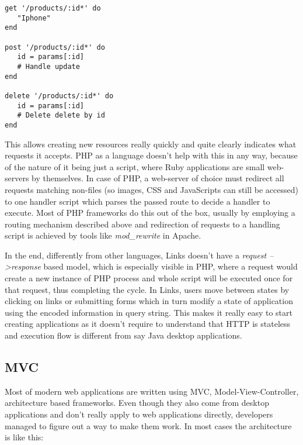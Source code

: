 \begin{codelisting}
\begin{verbatim}
get '/products/:id*' do
   "Iphone"
end

post '/products/:id*' do
   id = params[:id]
   # Handle update
end

delete '/products/:id*' do
   id = params[:id]
   # Delete delete by id
end
\end{verbatim}
\end{codelisting}

This allows creating new resources really quickly and quite clearly indicates what requests it accepts. PHP as a language doesn't help with this in any way, because of the nature of it being just a script, where Ruby applications are small web-servers by themselves. In case of PHP, a web-server of choice must redirect all requests matching non-files (so images, CSS and JavaScripts can still be accessed) to one handler script which parses the passed route to decide a handler to execute. Most of PHP frameworks do this out of the box, usually by employing a routing mechanism described above and redirection of requests to a handling script is achieved by tools like \textit{mod\_rewrite} in Apache.

In the end, differently from other languages, Links doesn't have a \textit{request --\textgreater  response} based model, which is especially visible in PHP, where a request would create a new instance of PHP process and whole script will be executed once for that request, thus completing the cycle. In Links, users move between states by clicking on links or submitting forms which in turn modify a state of application using the encoded information in query string. This makes it really easy to start creating applications as it doesn't require to understand that HTTP is stateless and execution flow is different from say Java desktop applications.

\subsection{MVC}

Most of modern web applications are written using MVC\citep{mvc}, Model-View-Controller, architecture based frameworks. Even though they also come from desktop applications and don't really apply to web applications directly, developers managed to figure out a way to make them work. In most cases the architecture is like this:

